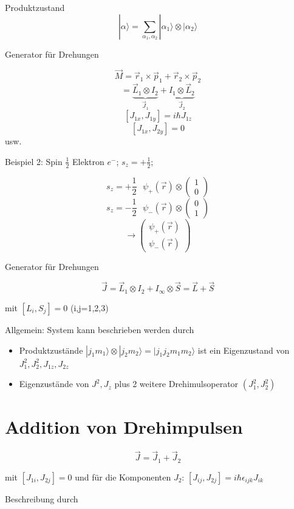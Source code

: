 Produktzustand
\[ |\alpha\rangle = \sum_{\alpha_1,\alpha_2}|\alpha_1\rangle \otimes |\alpha_2\rangle \]

Generator für Drehungen

\[ \vec M=\vec r_1 \times \vec p_1 + \vec r_2 \times \vec p_2 \]
\[=\underbrace{\vec L_1 \otimes I_2}_{\vec J_1}+\underbrace{I_1\otimes\vec
  L_2}_{\vec J_2}\]
\[ [J_{1x},J_{1y}]=i\hbar J_{1z}\]
\[ [J_{1x},J_{2y}]=0\]
usw.

Beispiel 2: Spin \(\frac 1 2\) Elektron \(e^-\); \(s_z=+\frac 1 2\);

 \[ s_z=+\frac 1 2 \text{     } \psi_+(\vec r)\otimes\left(\begin{array}{c}1\\0\end{array}\right)\]
\[ s_z=-\frac 1 2 \text{     } \psi_-(\vec
r)\otimes\left(\begin{array}{c}0\\1\end{array}\right)\]
\[ \rightarrow \left(\begin{array}{c}  \psi_+(\vec r)\\ \psi_-(\vec r)\end{array}\right)\]


Generator für Drehungen

\[ \vec J = \vec L_1 \otimes I_2 + I_{\infty}\otimes\vec S = \vec L + \vec S \]

mit \([L_i,S_j]=0\) (i,j=1,2,3)

Allgemein:
System kann beschrieben werden durch

\begin{itemize}
\item Produktzustände \(|j_1m_1\rangle\otimes|j_2m_2\rangle =
  |j_1j_2m_1m_2\rangle\) ist ein Eigenzustand von \(J_1^2,J_2^2,J_{1z},J_{2z}\)
\item Eigenzustände von \(J^2,J_z\) plus 2 weitere Drehimulsoperator \((J^2_1,J^2_2)\)
\end{itemize}



\section{Addition von Drehimpulsen}

\[ \vec J=\vec J_1+\vec J_2 \]

mit \([J_{1i},J_{2j}]=0\) und für die Komponenten \(J_2\):
\([J_{ij},J_{2j}]=i\hbar\epsilon_{ijk}J_{ik}\)

Beschreibung durch

